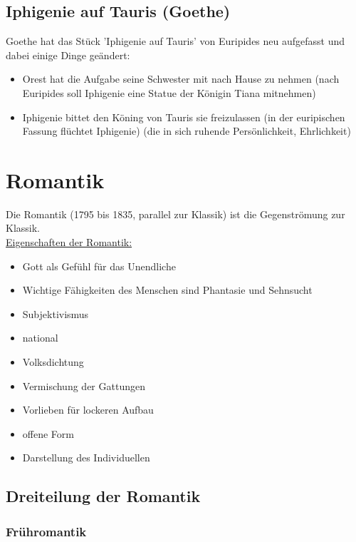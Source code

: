 \documentclass[12pt,a4paper]{article}
\begin{document}
\subsection{Iphigenie auf Tauris (Goethe)}

Goethe hat das Stück 'Iphigenie auf Tauris' von Euripides neu aufgefasst und dabei einige Dinge geändert:

\begin{itemize}
\item Orest hat die Aufgabe seine Schwester mit nach Hause zu nehmen (nach Euripides soll Iphigenie eine Statue der Königin Tiana mitnehmen)
\item Iphigenie bittet den Köning von Tauris sie freizulassen (in der euripischen Fassung flüchtet Iphigenie) (die in sich ruhende Persönlichkeit, Ehrlichkeit)
\end{itemize}

\newpage

\section{Romantik}

Die Romantik (1795 bis 1835, parallel zur Klassik) ist die Gegenströmung zur Klassik.\\

\underline{Eigenschaften der Romantik:}

\begin{itemize}
\item Gott als Gefühl für das Unendliche
\item Wichtige Fähigkeiten des Menschen sind Phantasie und Sehnsucht
\item Subjektivismus
\item national
\item Volksdichtung
\item Vermischung der Gattungen
\item Vorlieben für lockeren Aufbau
\item offene Form
\item Darstellung des Individuellen
\end{itemize}

\subsection{Dreiteilung der Romantik}

\subsubsection{Frühromantik}
\end{document}
